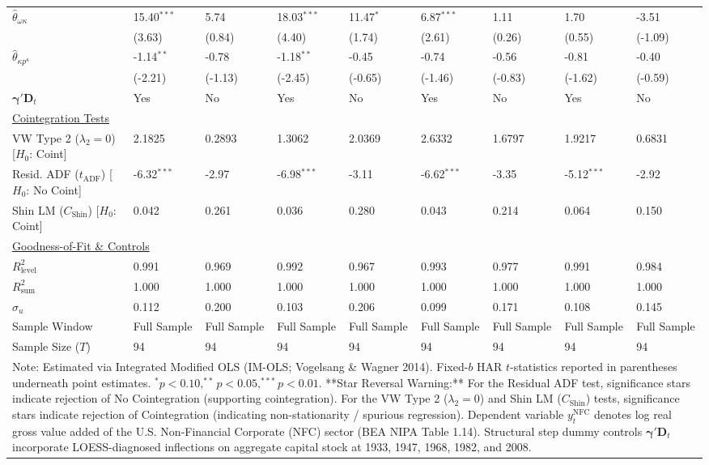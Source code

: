 \begin{landscape}
\begin{table}[H]
\begin{tabular}{p{5.0cm}p{1.5cm}p{1.5cm}p{1.5cm}p{1.5cm}p{1.5cm}p{1.5cm}p{1.5cm}p{1.5cm}}
$\hat{\theta}_{\omega \kappa}$ & 15.40$^{***}$ & 5.74 & 18.03$^{***}$ & 11.47$^{*}$ & 6.87$^{***}$ & 1.11 & 1.70 & -3.51  \\
 & {\scriptsize (3.63)} & {\scriptsize (0.84)} & {\scriptsize (4.40)} & {\scriptsize (1.74)} & {\scriptsize (2.61)} & {\scriptsize (0.26)} & {\scriptsize (0.55)} & {\scriptsize (-1.09)}  \\
$\hat{\theta}_{\kappa p^{\kappa}}$ & -1.14$^{**}$ & -0.78 & -1.18$^{**}$ & -0.45 & -0.74 & -0.56 & -0.81 & -0.40  \\
 & {\scriptsize (-2.21)} & {\scriptsize (-1.13)} & {\scriptsize (-2.45)} & {\scriptsize (-0.65)} & {\scriptsize (-1.46)} & {\scriptsize (-0.83)} & {\scriptsize (-1.62)} & {\scriptsize (-0.59)}  \\
$\boldsymbol{\gamma}' \mathbf{D}_t$ & Yes & No & Yes & No & Yes & No & Yes & No  \\
\midrule
\multicolumn{9}{l}{\underline{Cointegration Tests}} \\
VW Type 2 ($\lambda_2 = 0$) [$H_0$: Coint] & 2.1825 & 0.2893 & 1.3062 & 2.0369 & 2.6332 & 1.6797 & 1.9217 & 0.6831  \\
Resid. ADF ($t_{\text{ADF}}$) [$H_0$: No Coint] & -6.32$^{***}$ & -2.97 & -6.98$^{***}$ & -3.11 & -6.62$^{***}$ & -3.35 & -5.12$^{***}$ & -2.92  \\
Shin LM ($C_{\text{Shin}}$) [$H_0$: Coint] & 0.042 & 0.261 & 0.036 & 0.280 & 0.043 & 0.214 & 0.064 & 0.150  \\
\midrule
\multicolumn{9}{l}{\underline{Goodness-of-Fit \& Controls}} \\
$R_{\text{level}}^2$ & 0.991 & 0.969 & 0.992 & 0.967 & 0.993 & 0.977 & 0.991 & 0.984  \\
$R_{\text{sum}}^2$ & 1.000 & 1.000 & 1.000 & 1.000 & 1.000 & 1.000 & 1.000 & 1.000  \\
$\hat{\sigma}_u$ & 0.112 & 0.200 & 0.103 & 0.206 & 0.099 & 0.171 & 0.108 & 0.145  \\
Sample Window & Full Sample & Full Sample & Full Sample & Full Sample & Full Sample & Full Sample & Full Sample & Full Sample  \\
Sample Size ($T$) & 94 & 94 & 94 & 94 & 94 & 94 & 94 & 94  \\
\bottomrule
\multicolumn{9}{p{19.5cm}}{\footnotesize Note: Estimated via Integrated Modified OLS (IM-OLS; Vogelsang \& Wagner 2014). Fixed-$b$ HAR $t$-statistics reported in parentheses underneath point estimates. $^*p<0.10, ^{**}p<0.05, ^{***}p<0.01$. **Star Reversal Warning:** For the Residual ADF test, significance stars indicate rejection of No Cointegration (supporting cointegration). For the VW Type 2 ($\lambda_2 = 0$) and Shin LM ($C_{\text{Shin}}$) tests, significance stars indicate rejection of Cointegration (indicating non-stationarity / spurious regression). Dependent variable $y_t^{\text{NFC}}$ denotes log real gross value added of the U.S. Non-Financial Corporate (NFC) sector (BEA NIPA Table 1.14). Structural step dummy controls $\boldsymbol{\gamma}' \mathbf{D}_t$ incorporate LOESS-diagnosed inflections on aggregate capital stock at 1933, 1947, 1968, 1982, and 2008.}

\end{tabular}
\end{table}
\end{landscape}
